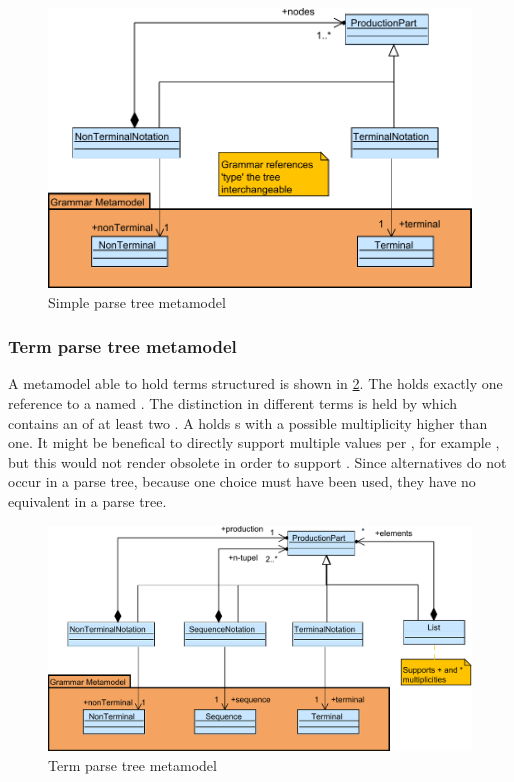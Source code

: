 \begin{figure}
\centering
\includegraphics[scale=0.75]{gfx/ex/Notation_ParseTree} 
\caption{Simple parse tree metamodel}
\label{MM:Not:PT}
\end{figure}

\subsubsection{Term parse tree metamodel}A metamodel able to hold terms structured is shown in \ref{MM:Not:TT}. The  holds exactly one reference to a  named . The distinction in different terms is held by  which contains an  of at least two . A  holds s with a possible multiplicity higher than one. It might be benefical to directly support multiple values per , for example , but this would not render  obsolete in order to support . Since alternatives do not occur in a parse tree, because one choice must have been used, they have no equivalent in a parse tree. 

\begin{figure}
\centering
\includegraphics[scale=0.75]{gfx/ex/Notation_TermTree} 
\caption{Term parse tree metamodel}
\label{MM:Not:TT}
\end{figure}

